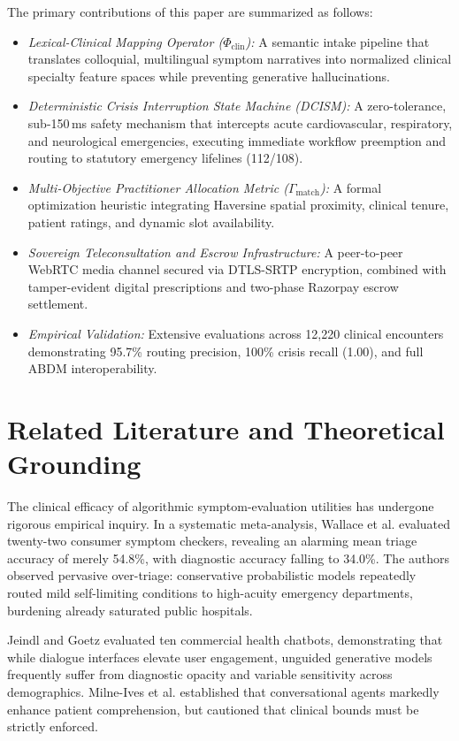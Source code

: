 \documentclass[conference]{IEEEtran}
\begin{document}
The primary contributions of this paper are summarized as follows:
\begin{itemize}
    \item \textit{Lexical-Clinical Mapping Operator ($\Phi_{\text{clin}}$):} A semantic intake pipeline that translates colloquial, multilingual symptom narratives into normalized clinical specialty feature spaces while preventing generative hallucinations.
    \item \textit{Deterministic Crisis Interruption State Machine (DCISM):} A zero-tolerance, sub-150\,ms safety mechanism that intercepts acute cardiovascular, respiratory, and neurological emergencies, executing immediate workflow preemption and routing to statutory emergency lifelines (112/108).
    \item \textit{Multi-Objective Practitioner Allocation Metric ($\Gamma_{\text{match}}$):} A formal optimization heuristic integrating Haversine spatial proximity, clinical tenure, patient ratings, and dynamic slot availability.
    \item \textit{Sovereign Teleconsultation and Escrow Infrastructure:} A peer-to-peer WebRTC media channel secured via DTLS-SRTP encryption, combined with tamper-evident digital prescriptions and two-phase Razorpay escrow settlement.
    \item \textit{Empirical Validation:} Extensive evaluations across 12,220 clinical encounters demonstrating 95.7\% routing precision, 100\% crisis recall (1.00), and full ABDM interoperability.
\end{itemize}

\section{Related Literature and Theoretical Grounding}
The clinical efficacy of algorithmic symptom-evaluation utilities has undergone rigorous empirical inquiry. In a systematic meta-analysis, Wallace et al. \cite{wallace2022} evaluated twenty-two consumer symptom checkers, revealing an alarming mean triage accuracy of merely 54.8\%, with diagnostic accuracy falling to 34.0\%. The authors observed pervasive over-triage: conservative probabilistic models repeatedly routed mild self-limiting conditions to high-acuity emergency departments, burdening already saturated public hospitals.

Jeindl and Goetz \cite{jeindl2022} evaluated ten commercial health chatbots, demonstrating that while dialogue interfaces elevate user engagement, unguided generative models frequently suffer from diagnostic opacity and variable sensitivity across demographics. Milne-Ives et al. \cite{milneives2020} established that conversational agents markedly enhance patient comprehension, but cautioned that clinical bounds must be strictly enforced.
\end{document}
